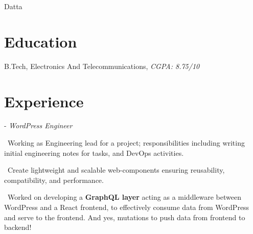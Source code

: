 \documentclass[]{resume}
\begin{document}
     
  
 {Datta}\\\vspace{4pt}\underlineheader{}




%
%
\section{Education}
\raggedright

    \hspace*{\fill}  

    B.Tech, Electronics And Telecommunications, \textit{CGPA: 8.75/10}\hspace*{\fill}

    \sectionsep


       \section{Experience}
       \raggedright
         
            - \textit{WordPress Engineer}\hspace*{\fill}  

            \textbullet\ Working as Engineering lead for a project; responsibilities including writing initial engineering notes for tasks, and DevOps activities.

            \textbullet\ Create lightweight and scalable web-components ensuring reusability, compatibility, and performance. 

            \textbullet\ Worked on developing a \textbf{GraphQL layer} acting as a middleware between WordPress and a React frontend, to effectively consume data from WordPress and serve to the frontend. And yes, mutations to push data from frontend to backend!
\end{document}
